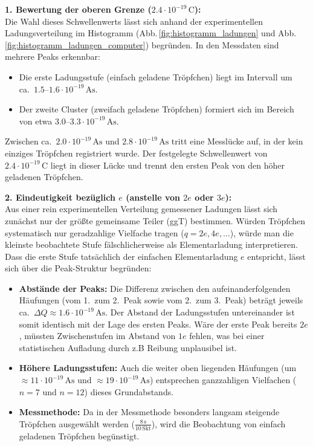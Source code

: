 \documentclass[12pt,a4paper,titlepage]{scrartcl}
\numberwithin{equation}{section}
\numberwithin{table}{section}
\numberwithin{figure}{section}
\begin{document}
\medskip
\noindent
\textbf{1. Bewertung der oberen Grenze ($2.4 \cdot 10^{-19}\,\text{C}$):}\\
Die Wahl dieses Schwellenwerts lässt sich anhand der experimentellen Ladungsverteilung im Histogramm
(Abb.\,\ref{fig:histogramm_ladungen} und Abb.\,\ref{fig:histogramm_ladungen_computer}) begründen.
In den Messdaten sind mehrere Peaks erkennbar:

\begin{itemize}
    \item Die erste Ladungsstufe (einfach geladene Tröpfchen) liegt im Intervall um ca.~$1.5\text{--}1.6 \cdot 10^{-19}\,\text{As}$.
    \item Der zweite Cluster (zweifach geladene Tröpfchen) formiert sich im Bereich von etwa $3.0\text{--}3.3 \cdot 10^{-19}\,\text{As}$.
\end{itemize}

\noindent
Zwischen ca.~$2.0 \cdot 10^{-19}\,\text{As}$ und $2.8 \cdot 10^{-19}\,\text{As}$ tritt eine Messlücke auf, in der kein einziges Tröpfchen registriert wurde.
Der festgelegte Schwellenwert von $2.4 \cdot 10^{-19}\,\text{C}$ liegt in dieser Lücke und trennt den ersten Peak von den höher geladenen Tröpfchen.

\medskip
\noindent
\textbf{2. Eindeutigkeit bezüglich $e$ (anstelle von $2e$ oder $3e$):}\\
Aus einer rein experimentellen Verteilung gemessener Ladungen lässt sich zunächst nur der größte gemeinsame Teiler (ggT) bestimmen. 
Würden Tröpfchen systematisch nur geradzahlige Vielfache tragen ($q = 2e, 4e, \dots$), würde man die kleinste beobachtete Stufe 
fälschlicherweise als Elementarladung interpretieren.
Dass die erste Stufe tatsächlich der einfachen Elementarladung $e$ entspricht, lässt sich über die Peak-Struktur begründen:
\begin{itemize}
    \item \textbf{Abstände der Peaks:} Die Differenz zwischen den aufeinanderfolgenden Häufungen (vom 1.~zum 2.~Peak sowie vom 2.~zum 3.~Peak) beträgt
    jeweils ca.~$\Delta Q \approx 1.6 \cdot 10^{-19}\,\text{As}$. Der Abstand der Ladungsstufen untereinander ist somit identisch mit der Lage 
    des ersten Peaks. Wäre der erste Peak bereits $2e$, müssten Zwischenstufen im Abstand von $1e$ fehlen, was bei einer statistischen Aufladung durch z.B Reibung unplausibel ist.
    \item \textbf{Höhere Ladungsstufen:} Auch die weiter oben liegenden Häufungen (um $\approx 11 \cdot 10^{-19}\,\text{As}$ und $\approx 19 \cdot 10^{-19}\,\text{As}$) 
    entsprechen ganzzahligen Vielfachen ($n=7$ und $n=12$) dieses Grundabstands.
    \item \textbf{Messmethode:} Da in der Messmethode besonders langsam steigende Tröpfchen ausgewählt werden ($\frac{8\,\text{s}}{10\,\text{Skt}}$), wird 
    die Beobachtung von einfach geladenen Tröpfchen begünstigt.
\end{itemize}
\end{document}
